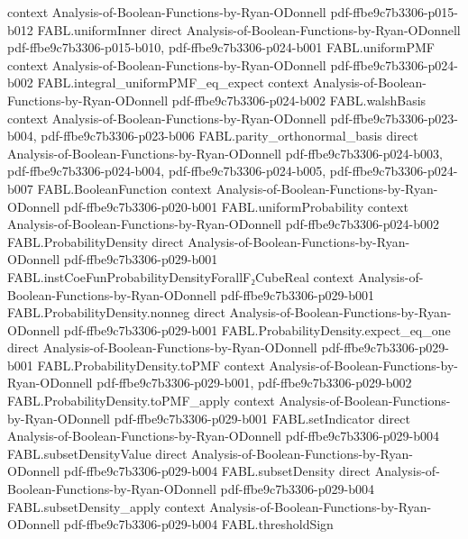 \begin{theorem}
  {context}
  {Analysis-of-Boolean-Functions-by-Ryan-ODonnell}
  {pdf-ffbe9c7b3306-p015-b012}
\proofstep
  {FABL.uniformInner}
  {direct}
  {Analysis-of-Boolean-Functions-by-Ryan-ODonnell}
  {pdf-ffbe9c7b3306-p015-b010,
    pdf-ffbe9c7b3306-p024-b001}
\proofstep
  {FABL.uniformPMF}
  {context}
  {Analysis-of-Boolean-Functions-by-Ryan-ODonnell}
  {pdf-ffbe9c7b3306-p024-b002}
\proofstep
  {FABL.integral_uniformPMF_eq_expect}
  {context}
  {Analysis-of-Boolean-Functions-by-Ryan-ODonnell}
  {pdf-ffbe9c7b3306-p024-b002}
\proofstep
  {FABL.walshBasis}
  {context}
  {Analysis-of-Boolean-Functions-by-Ryan-ODonnell}
  {pdf-ffbe9c7b3306-p023-b004,
    pdf-ffbe9c7b3306-p023-b006}
\proofstep
  {FABL.parity_orthonormal_basis}
  {direct}
  {Analysis-of-Boolean-Functions-by-Ryan-ODonnell}
  {pdf-ffbe9c7b3306-p024-b003,
    pdf-ffbe9c7b3306-p024-b004,
    pdf-ffbe9c7b3306-p024-b005,
    pdf-ffbe9c7b3306-p024-b007}
\proofstep
  {FABL.BooleanFunction}
  {context}
  {Analysis-of-Boolean-Functions-by-Ryan-ODonnell}
  {pdf-ffbe9c7b3306-p020-b001}
\proofstep
  {FABL.uniformProbability}
  {context}
  {Analysis-of-Boolean-Functions-by-Ryan-ODonnell}
  {pdf-ffbe9c7b3306-p024-b002}
\proofstep
  {FABL.ProbabilityDensity}
  {direct}
  {Analysis-of-Boolean-Functions-by-Ryan-ODonnell}
  {pdf-ffbe9c7b3306-p029-b001}
\proofstep
  {FABL.instCoeFunProbabilityDensityForallF₂CubeReal}
  {context}
  {Analysis-of-Boolean-Functions-by-Ryan-ODonnell}
  {pdf-ffbe9c7b3306-p029-b001}
\proofstep
  {FABL.ProbabilityDensity.nonneg}
  {direct}
  {Analysis-of-Boolean-Functions-by-Ryan-ODonnell}
  {pdf-ffbe9c7b3306-p029-b001}
\proofstep
  {FABL.ProbabilityDensity.expect_eq_one}
  {direct}
  {Analysis-of-Boolean-Functions-by-Ryan-ODonnell}
  {pdf-ffbe9c7b3306-p029-b001}
\proofstep
  {FABL.ProbabilityDensity.toPMF}
  {context}
  {Analysis-of-Boolean-Functions-by-Ryan-ODonnell}
  {pdf-ffbe9c7b3306-p029-b001,
    pdf-ffbe9c7b3306-p029-b002}
\proofstep
  {FABL.ProbabilityDensity.toPMF_apply}
  {context}
  {Analysis-of-Boolean-Functions-by-Ryan-ODonnell}
  {pdf-ffbe9c7b3306-p029-b001}
\proofstep
  {FABL.setIndicator}
  {direct}
  {Analysis-of-Boolean-Functions-by-Ryan-ODonnell}
  {pdf-ffbe9c7b3306-p029-b004}
\proofstep
  {FABL.subsetDensityValue}
  {direct}
  {Analysis-of-Boolean-Functions-by-Ryan-ODonnell}
  {pdf-ffbe9c7b3306-p029-b004}
\proofstep
  {FABL.subsetDensity}
  {direct}
  {Analysis-of-Boolean-Functions-by-Ryan-ODonnell}
  {pdf-ffbe9c7b3306-p029-b004}
\proofstep
  {FABL.subsetDensity_apply}
  {context}
  {Analysis-of-Boolean-Functions-by-Ryan-ODonnell}
  {pdf-ffbe9c7b3306-p029-b004}
\proofstep
  {FABL.thresholdSign}

\end{theorem}
